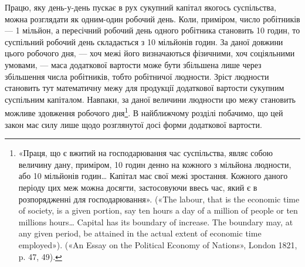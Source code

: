 Працю, яку день-у-день пускає в рух сукупний капітал
якогось суспільства, можна розглядати як одним-один робочий
день. Коли, приміром, число робітників — 1 мільйон, а пересічний
робочий день одного робітника становить 10 годин, то суспільний
робочий день складається з 10 мільйонів годин. За даної
довжини цього робочого дня, — хоч межі його визначаються фізичними,
хоч соціяльними умовами, — маса додаткової вартости може
бути збільшена лише через збільшення числа робітників, тобто
робітничої людности. Зріст людности становить тут математичну
межу для продукції додаткової вартости сукупним суспільним
капіталом. Навпаки, за даної величини людности цю межу становить
можливе здовження робочого дня\footnote{
«Праця, що є вжитий на господарювання час суспільства, являє
собою величину дану, приміром, 10 годин денно на кожного з мільйона
людности, або 10 мільйонів годин\dots{} Капітал має свої межі зростання.
Кожного даного періоду цих меж можна досягти, застосовуючи ввесь
час, який є в розпорядженні для господарювання». («The labour, that
is the economic time of society, is a given portion, say ten hours a day of
a million of people or ten millions hours\dots{} Capital has its boundary of
increase. The boundary may, at any given period, be attained in the actual
extent of economic time employed»). («An Essay on the Political Economy
of Nations», London 1821, p. 47, 49).
}. В найближчому розділі
побачимо, що цей закон має силу лише щодо розглянутої досі
форми додаткової вартости.

